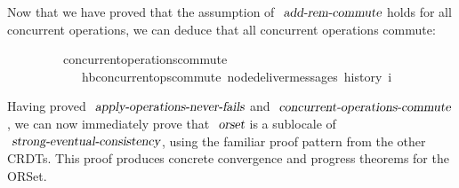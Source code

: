 \vspace{0.275em}
\noindent Now that we have proved that the assumption of $\isa{add-rem-commute}$ holds for all concurrent operations, we can deduce that all concurrent operations commute:
\vspace{0.275em}
\begin{isabellebody}
\ \ \ \ \ \ \ \ \ concurrent{\isacharunderscore}operations{\isacharunderscore}commute{\isacharcolon}\isanewline
\ \ \ \ \ \ \ \ \ \ \ \ {\isachardoublequoteopen}hb{\isachardot}concurrent{\isacharunderscore}ops{\isacharunderscore}commute\ {\isacharparenleft}node{\isacharunderscore}deliver{\isacharunderscore}messages\ {\isacharparenleft}history\ i{\isacharparenright}{\isacharparenright}{\isachardoublequoteclose}
\end{isabellebody}
\vspace{0.275em}

Having proved $\isa{apply-operations-never-fails}$ and $\isa{concurrent-operations-commute}$, we can now immediately prove that $\isa{orset}$ is a sublocale of $\isa{strong-eventual-consistency}$, using the familiar proof pattern from the other CRDTs.
This proof produces concrete convergence and progress theorems for the ORSet.
